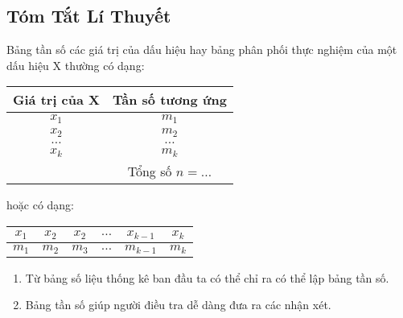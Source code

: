 \subsection{Tóm Tắt Lí Thuyết}
	Bảng tần số các giá trị của dấu hiệu hay bảng phân phối thực nghiệm của một dấu hiệu X thường có dạng:
		\begin{center}
			\begin{tabular}{|c|c|}
				\hline
				Giá trị của X & Tần số tương ứng \\
				\hline
				$x_1$ & $m_1$\\
				$x_2$ & $m_2$\\
				$\ldots$ & $\ldots$\\
				$x_k$ & $m_k$\\
				\hline
				      & Tổng số $n=\ldots$\\
				\hline
			\end{tabular}
		\end{center}
	hoặc có dạng:
		\begin{center}
			\begin{tabular}{ |c|c|c|c|c|c|}
				\hline
				$x_1$ & $x_2$ & $x_2$ & $\ldots$ &$x_{k-1}$ & $x_k$\\
				\hline
				$m_1$ & $m_2$ & $m_3$ & $\ldots$ &$m_{k-1}$ & $m_k$\\
				\hline
			\end{tabular}
		\end{center}
	\begin{nx}
		\begin{enumerate}
			\item Từ bảng số liệu thống kê ban đầu ta có thể chỉ ra có thể lập bảng tần số.
			\item Bảng tần số giúp người điều tra dễ dàng đưa ra các nhận xét.
		\end{enumerate}
	\end{nx}
